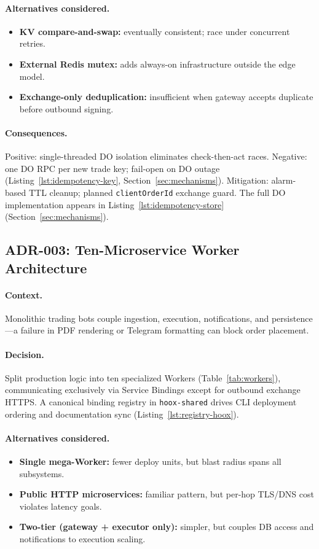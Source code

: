 \paragraph{Alternatives considered.}
\begin{itemize}
  \item \textbf{KV compare-and-swap:} eventually consistent; race under concurrent retries.
  \item \textbf{External Redis mutex:} adds always-on infrastructure outside the edge model.
  \item \textbf{Exchange-only deduplication:} insufficient when gateway accepts duplicate before outbound signing.
\end{itemize}

\paragraph{Consequences.} Positive: single-threaded DO isolation eliminates check-then-act races. Negative: one DO RPC per new trade key; fail-open on DO outage (Listing~\ref{lst:idempotency-key}, Section~\ref{sec:mechanisms}). Mitigation: alarm-based TTL cleanup; planned \texttt{clientOrderId} exchange guard. The full DO implementation appears in Listing~\ref{lst:idempotency-store} (Section~\ref{sec:mechanisms}).

\subsection{ADR-003: Ten-Microservice Worker Architecture}

\paragraph{Context.} Monolithic trading bots couple ingestion, execution, notifications, and persistence---a failure in PDF rendering or Telegram formatting can block order placement.

\paragraph{Decision.} Split production logic into ten specialized Workers (Table~\ref{tab:workers}), communicating exclusively via Service Bindings except for outbound exchange HTTPS. A canonical binding registry in \texttt{hoox-shared} drives CLI deployment ordering and documentation sync (Listing~\ref{lst:registry-hoox}).

\paragraph{Alternatives considered.}
\begin{itemize}
  \item \textbf{Single mega-Worker:} fewer deploy units, but blast radius spans all subsystems.
  \item \textbf{Public HTTP microservices:} familiar pattern, but per-hop TLS/DNS cost violates latency goals.
  \item \textbf{Two-tier (gateway + executor only):} simpler, but couples DB access and notifications to execution scaling.
\end{itemize}

